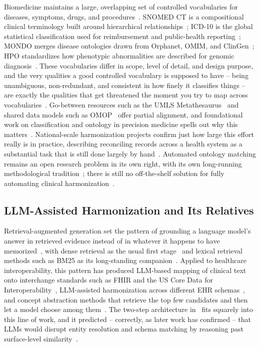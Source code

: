 \documentclass[conference]{IEEEtran}
\begin{document}
Biomedicine maintains a large, overlapping set of controlled vocabularies for diseases, symptoms, drugs, and procedures~\cite{b7,b8,b9,b10}. SNOMED CT is a compositional clinical terminology built around hierarchical relationships~\cite{b7}; ICD-10 is the global statistical classification used for reimbursement and public-health reporting~\cite{b8}; MONDO merges disease ontologies drawn from Orphanet, OMIM, and ClinGen~\cite{b9}; HPO standardizes how phenotypic abnormalities are described for genomic diagnosis~\cite{b10}. These vocabularies differ in scope, level of detail, and design purpose, and the very qualities a good controlled vocabulary is supposed to have -- being unambiguous, non-redundant, and consistent in how finely it classifies things -- are exactly the qualities that get threatened the moment you try to map across vocabularies~\cite{b11}. Go-between resources such as the UMLS Metathesaurus~\cite{b12} and shared data models such as OMOP~\cite{b13} offer partial alignment, and foundational work on classification and ontology in precision medicine spells out why this matters~\cite{b14}. National-scale harmonization projects confirm just how large this effort really is in practice, describing reconciling records across a health system as a substantial task that is still done largely by hand~\cite{b49}. Automated ontology matching remains an open research problem in its own right, with its own long-running methodological tradition~\cite{b29}; there is still no off-the-shelf solution for fully automating clinical harmonization~\cite{b1}.

\subsection{LLM-Assisted Harmonization and Its Relatives}

Retrieval-augmented generation set the pattern of grounding a language model's answer in retrieved evidence instead of in whatever it happens to have memorized~\cite{b15}, with dense retrieval as the usual first stage~\cite{b16} and lexical retrieval methods such as BM25 as its long-standing companion~\cite{b17}. Applied to healthcare interoperability, this pattern has produced LLM-based mapping of clinical text onto interchange standards such as FHIR and the US Core Data for Interoperability~\cite{b41,b46,b62}, LLM-assisted harmonization across different EHR schemas~\cite{b39}, and concept abstraction methods that retrieve the top few candidates and then let a model choose among them~\cite{b40}. The two-step architecture in~\cite{b1} fits squarely into this line of work, and it predicted -- correctly, as later work has confirmed -- that LLMs would disrupt entity resolution and schema matching by reasoning past surface-level similarity~\cite{b38}.
\end{document}
